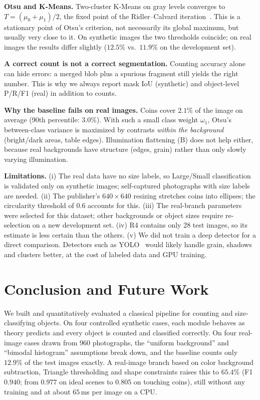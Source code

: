 \documentclass[conference,a4paper]{IEEEtran}
\begin{document}
\textbf{Otsu and K-Means.} Two-cluster K-Means on gray levels converges to $T=(\mu_0+\mu_1)/2$, the fixed point of the Ridler--Calvard iteration~\cite{ridler1978}. This is a stationary point of Otsu's criterion, not necessarily its global maximum, but usually very close to it. On synthetic images the two thresholds coincide; on real images the results differ slightly ($12.5\%$ vs.\ $11.9\%$ on the development set).

\textbf{A correct count is not a correct segmentation.} Counting accuracy alone can hide errors: a merged blob plus a spurious fragment still yields the right number. This is why we always report mask IoU (synthetic) and object-level P/R/F1 (real) in addition to counts.

\textbf{Why the baseline fails on real images.} Coins cover $2.1\%$ of the image on average (90th percentile: $3.0\%$). With such a small class weight $\omega_1$, Otsu's between-class variance is maximized by contrasts \emph{within the background} (bright/dark areas, table edges). Illumination flattening (B) does not help either, because real backgrounds have structure (edges, grain) rather than only slowly varying illumination.

\textbf{Limitations.} (i) The real data have no size labels, so Large/Small classification is validated only on synthetic images; self-captured photographs with size labels are needed. (ii) The publisher's $640\times640$ resizing stretches coins into ellipses; the circularity threshold of $0.6$ accounts for this. (iii) The real-branch parameters were selected for this dataset; other backgrounds or object sizes require re-selection on a new development set. (iv) R4 contains only 28 test images, so its estimate is less certain than the others. (v) We did not train a deep detector for a direct comparison. Detectors such as YOLO~\cite{redmon2016} would likely handle grain, shadows and clusters better, at the cost of labeled data and GPU training.

\section{Conclusion and Future Work}
We built and quantitatively evaluated a classical pipeline for counting and size-classifying objects. On four controlled synthetic cases, each module behaves as theory predicts and every object is counted and classified correctly. On four real-image cases drawn from 960 photographs, the ``uniform background'' and ``bimodal histogram'' assumptions break down, and the baseline counts only $12.9\%$ of the test images exactly. A real-image branch based on color background subtraction, Triangle thresholding and shape constraints raises this to $65.4\%$ (F1 $0.940$; from $0.977$ on ideal scenes to $0.805$ on touching coins), still without any training and at about $65$\,ms per image on a CPU.
\end{document}
